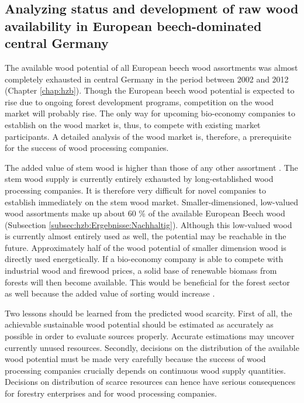 \subsection{Analyzing status and development of raw wood availability in European beech-dominated central Germany}
\label{subsec:discussion:struct:hzb}
The available wood potential of all European beech wood assortments was almost completely exhausted in central Germany in the period between 2002 and 2012 (Chapter \ref{chap:hzb}). Though the European beech wood potential is expected to rise due to ongoing forest development programs, competition on the wood market will probably rise. The only way for upcoming bio-economy companies to establish on the wood market is, thus, to compete with existing market participants. A detailed analysis of the wood market is, therefore, a prerequisite for the success of wood processing companies.

The added value of stem wood is higher than those of any other assortment \citep{nagel_2008}. The stem wood supply is currently entirely exhausted by long-established wood processing companies. It is therefore very difficult for novel companies to establish immediately on the stem wood market. Smaller-dimensioned, low-valued wood assortments make up about 60 \% of the available European Beech wood (Subsection \ref{subsec:hzb:Ergebnisse:Nachhaltig}). Although this low-valued wood is currently almost entirely used as well, the potential may be reachable in the future. Approximately half of the wood potential of smaller dimension wood is directly used energetically. If a bio-economy company is able to compete with industrial wood and firewood prices, a solid base of renewable biomass from forests will then become available. This would be beneficial for the forest sector as well because the added value of sorting would increase \cite[p. 67]{mohring_1997}.

Two lessons should be learned from the predicted wood scarcity. First of all, the achievable sustainable wood potential should be estimated as accurately as possible in order to evaluate sources properly. Accurate estimations may uncover currently unused resources. Secondly, decisions on the distribution of the available wood potential must be made very carefully because the success of wood processing companies crucially depends on continuous wood supply quantities. Decisions on distribution of scarce resources can hence have serious consequences for forestry enterprises and for wood processing companies.

